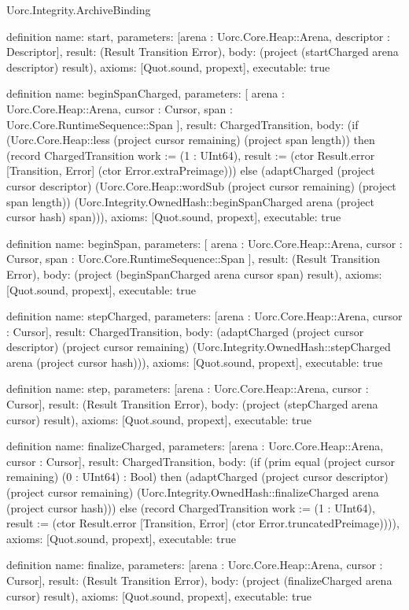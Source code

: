 \begin{lexlean}{Uorc.Integrity.ArchiveBinding}
\begin{semanticmodule}
definition{
  name: start,
  parameters: [arena : Uorc.Core.Heap::Arena, descriptor : Descriptor],
  result: (Result Transition Error),
  body: (project (startCharged arena descriptor) result),
  axioms: [Quot.sound, propext],
  executable: true
}

definition{
  name: beginSpanCharged,
  parameters: [
    arena : Uorc.Core.Heap::Arena,
    cursor : Cursor,
    span : Uorc.Core.RuntimeSequence::Span
  ],
  result: ChargedTransition,
  body: (if (Uorc.Core.Heap::less (project cursor remaining) (project span length)) then (record ChargedTransition {work := (1 : UInt64), result := (ctor Result.error [Transition, Error] (ctor Error.extraPreimage))}) else (adaptCharged (project cursor descriptor) (Uorc.Core.Heap::wordSub (project cursor remaining) (project span length)) (Uorc.Integrity.OwnedHash::beginSpanCharged arena (project cursor hash) span))),
  axioms: [Quot.sound, propext],
  executable: true
}

definition{
  name: beginSpan,
  parameters: [
    arena : Uorc.Core.Heap::Arena,
    cursor : Cursor,
    span : Uorc.Core.RuntimeSequence::Span
  ],
  result: (Result Transition Error),
  body: (project (beginSpanCharged arena cursor span) result),
  axioms: [Quot.sound, propext],
  executable: true
}

definition{
  name: stepCharged,
  parameters: [arena : Uorc.Core.Heap::Arena, cursor : Cursor],
  result: ChargedTransition,
  body: (adaptCharged (project cursor descriptor) (project cursor remaining) (Uorc.Integrity.OwnedHash::stepCharged arena (project cursor hash))),
  axioms: [Quot.sound, propext],
  executable: true
}

definition{
  name: step,
  parameters: [arena : Uorc.Core.Heap::Arena, cursor : Cursor],
  result: (Result Transition Error),
  body: (project (stepCharged arena cursor) result),
  axioms: [Quot.sound, propext],
  executable: true
}

definition{
  name: finalizeCharged,
  parameters: [arena : Uorc.Core.Heap::Arena, cursor : Cursor],
  result: ChargedTransition,
  body: (if (prim equal (project cursor remaining) (0 : UInt64) : Bool) then (adaptCharged (project cursor descriptor) (project cursor remaining) (Uorc.Integrity.OwnedHash::finalizeCharged arena (project cursor hash))) else (record ChargedTransition {work := (1 : UInt64), result := (ctor Result.error [Transition, Error] (ctor Error.truncatedPreimage))})),
  axioms: [Quot.sound, propext],
  executable: true
}

definition{
  name: finalize,
  parameters: [arena : Uorc.Core.Heap::Arena, cursor : Cursor],
  result: (Result Transition Error),
  body: (project (finalizeCharged arena cursor) result),
  axioms: [Quot.sound, propext],
  executable: true
}


\end{semanticmodule}
\end{lexlean}
